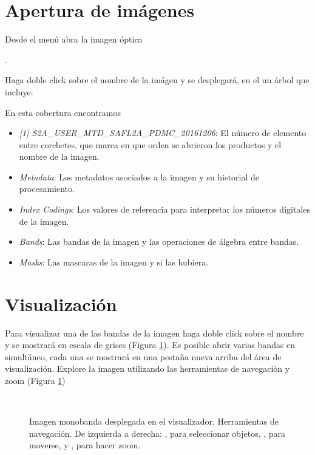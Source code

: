 \section{Apertura de imágenes}

Desde el menú  abra la imagen óptica
\begin{center} .
\end{center}
Haga doble click sobre el nombre de la imágen y se desplegará, en el  un árbol que incluye:
\\

En esta cobertura encontramos

\begin{itemize}
    \item \emph{[1] S2A\_USER\_MTD\_SAFL2A\_PDMC\_20161206}: El número de elemento entre corchetes, que marca en que orden se abrieron los productos y el nombre de la imagen.
    \item \emph{Metadata}: Los metadatos asociados a la imagen y su historial de procesamiento.
    \item \emph{Index Codings}: Los valores de referencia para interpretar los números digitales de la imagen.
    \item \emph{Bands}: Las bandas de la imagen y las operaciones de álgebra entre bandas.
    \item \emph{Masks}: Las mascaras de la imagen y si las hubiera.
\end{itemize}

\section{Visualización}

Para visualizar una de las bandas de la imagen haga doble click sobre el nombre y se mostrará en escala de grises (Figura \ref{fig:mono}). Es posible abrir varias bandas en simultáneo, cada una se mostrará en una pestaña nueva arriba del área de visualización. Explore la imagen utilizando las herramientas de navegación y zoom (Figura \ref{fig:mono})

\begin{figure}[h!]
    \centering
    \\
    \caption{Imagen monobanda desplegada en el visualizador. Herramientas de navegación. De izquierda a derecha: , para seleccionar objetos, , para moverse, y , para hacer zoom.}
    \label{fig:mono}
\end{figure}


